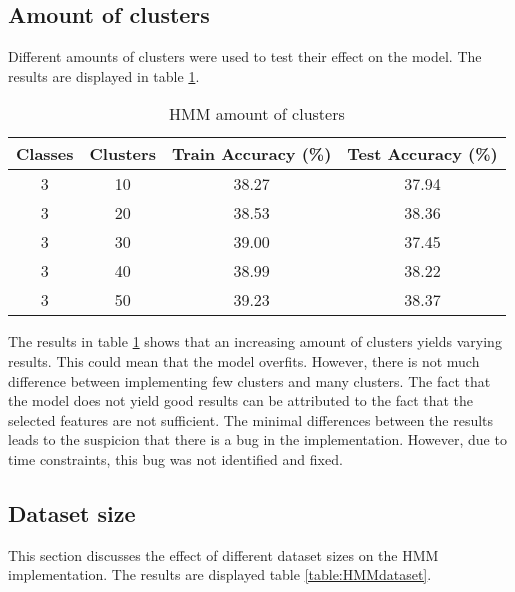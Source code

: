 \subsection*{Amount of clusters}
Different amounts of clusters were used to test their effect on the model. The results are displayed in table \ref{table:HMMclusters}.
\begin{table}[h!]
\begin{center}
\begin{tabular}{| c | c | c | c |}
\hline
 {\textbf{Classes}} 	 	& {\textbf{Clusters}} 
 & {\textbf{Train Accuracy (\%)}} 					& {\textbf{Test Accuracy (\%)}} 
 \\
\hline
3 	 		& 10			& 38.27		& 37.94		\\
3 	 		& 20			& 38.53		& 38.36		\\
3 	 		& 30			& 39.00		& 37.45		\\
3 	 		& 40			& 38.99		& 38.22		\\
3 	 		& 50			& 39.23		& 38.37		\\
\hline
\end{tabular}
\caption{HMM amount of clusters}
\label{table:HMMclusters}
\end{center}
\end{table}

The results in table \ref{table:HMMclusters} shows that an increasing amount of clusters yields varying results. This could mean that the model overfits. However, there is not much difference between implementing few clusters and many clusters. The fact that the model does not yield good results can be attributed to the fact that the selected features are not sufficient. The minimal differences between the results leads to the suspicion that there is a bug in the implementation. However, due to time constraints, this bug was not identified and fixed.

\subsection{Dataset size}
This section discusses the effect of different dataset sizes on the HMM implementation. The results are displayed table \ref{table:HMMdataset}.

